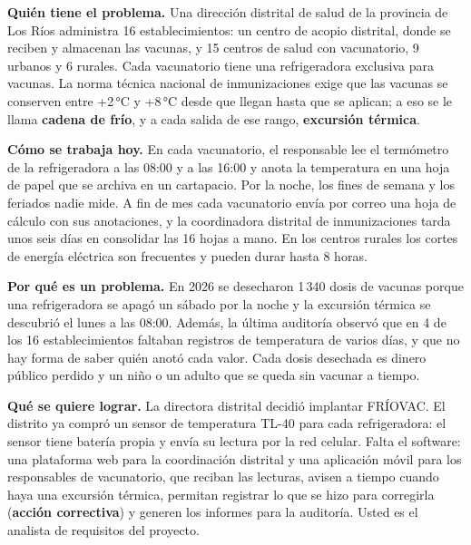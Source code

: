 \documentclass[11pt]{article}
\begin{document}
	\begin{cajacaso}[title={El problema que hay que resolver}]
		\textbf{Quién tiene el problema.} Una dirección distrital de salud de la provincia de Los Ríos administra 16 establecimientos: un centro de acopio distrital, donde se reciben y almacenan las vacunas, y 15 centros de salud con vacunatorio, 9 urbanos y 6 rurales. Cada vacunatorio tiene una refrigeradora exclusiva para vacunas. La norma técnica nacional de inmunizaciones exige que las vacunas se conserven entre +2\,°C y +8\,°C desde que llegan hasta que se aplican; a eso se le llama \textbf{cadena de frío}, y a cada salida de ese rango, \textbf{excursión térmica}.\par\smallskip
		\textbf{Cómo se trabaja hoy.} En cada vacunatorio, el responsable lee el termómetro de la refrigeradora a las 08:00 y a las 16:00 y anota la temperatura en una hoja de papel que se archiva en un cartapacio. Por la noche, los fines de semana y los feriados nadie mide. A fin de mes cada vacunatorio envía por correo una hoja de cálculo con sus anotaciones, y la coordinadora distrital de inmunizaciones tarda unos seis días en consolidar las 16 hojas a mano. En los centros rurales los cortes de energía eléctrica son frecuentes y pueden durar hasta 8 horas.\par\smallskip
		\textbf{Por qué es un problema.} En 2026 se desecharon 1\,340 dosis de vacunas porque una refrigeradora se apagó un sábado por la noche y la excursión térmica se descubrió el lunes a las 08:00. Además, la última auditoría observó que en 4 de los 16 establecimientos faltaban registros de temperatura de varios días, y que no hay forma de saber quién anotó cada valor. Cada dosis desechada es dinero público perdido y un niño o un adulto que se queda sin vacunar a tiempo.\par\smallskip
		\textbf{Qué se quiere lograr.} La directora distrital decidió implantar FRÍOVAC. El distrito ya compró un sensor de temperatura TL-40 para cada refrigeradora: el sensor tiene batería propia y envía su lectura por la red celular. Falta el software: una plataforma web para la coordinación distrital y una aplicación móvil para los responsables de vacunatorio, que reciban las lecturas, avisen a tiempo cuando haya una excursión térmica, permitan registrar lo que se hizo para corregirla (\textbf{acción correctiva}) y generen los informes para la auditoría. Usted es el analista de requisitos del proyecto.
	\end{cajacaso}
	
\end{document}
